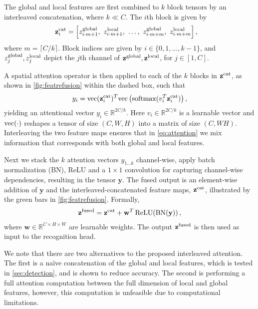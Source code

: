 \documentclass[runningheads]{llncs}
\begin{document}
The global and local features are first combined to $k$ block tensors by an interleaved concatenation, where $k 
\ll C$.
The $i$th block is given by
\begin{align}
\mathbf{z}^{\rm cat}_i &= \left[ z^{\rm global}_{i\cdot m+1},\ z^{\rm local}_{i\cdot m+1},\ \dots,\ {z}^{\rm global}_{i\cdot m + m},\ {z}^{\rm local}_{i\cdot m + m}\right],
\end{align}
where $m=\lceil C/k \rceil$.
Block indices are given by $i \in \{0, 1, \dots, k-1\}$, and ${z}^{\rm global}_j,{z}^{\rm local}_j$ depict the $j$th channel of $\mathbf{z}^{\rm global},\mathbf{z}^{\rm local}$, for $j\in[1,C]$.

A spatial attention operator is then applied to each of the $k$ blocks in $\mathbf{z}^{\rm cat}$, as shown in \cref{fig:featrefusion} within the dashed box, such that
\begin{align}
\label{eq:attention}
y_i = {\rm vec}(\mathbf{z}^{\rm cat}_i)^T
{\rm vec}\left( \operatorname{softmax}(v_i^T \mathbf{z}^{\rm cat}_i) \right), 
\end{align}
yielding an attentional vector $y_i\in {\mathbb R}^{2C/k}$.
Here ${v}_i \in {\mathbb R}^{2C/k}$ is a learnable vector and ${\rm vec}(\cdot)$ reshapes a tensor of size $(C,W,H)$ into a matrix of size $(C,WH)$.
Interleaving the two feature maps ensures that in 
\cref{eq:attention} we mix information that corresponds with both global and local features.

Next we stack the $k$ attention vectors $y_{1...k}$ channel-wise, apply batch normalization (BN), ReLU and a $1\times 1$ convolution for capturing channel-wise dependencies, resulting in the tensor $\mathbf{y}$. 
The fused output is an element-wise addition of $\mathbf{y}$ and the interleaved-concatenated feature maps, $\mathbf{z}^{\rm cat}$,
illustrated by the green bars in \cref{fig:featrefusion}. Formally, 
\begin{align}
    \mathbf{z}^{\rm fused} = \mathbf{z}^{\rm cat} + \mathbf{w}^T\operatorname{ReLU}(\operatorname{BN}(\mathbf{y}))\,,
\end{align}
where $\mathbf{w}\in{\mathbb R}^{C\times H\times W}$ are learnable weights.
The output $ \mathbf{z}^{\rm fused}$ is then used as input to the recognition head.

We note that there are two alternatives to the proposed interleaved attention.
The first is a na\"ive concatenation of the global and local features, which is tested in \cref{sec:detection}, and is shown to reduce accuracy.
The second is performing a full attention computation between the full dimension of local and global features, however, this computation is unfeasible due to computational limitations.
\end{document}
